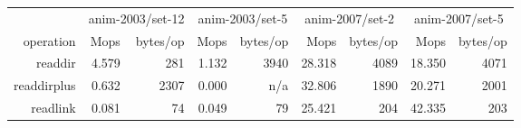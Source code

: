 \begin{table*}
\begin{tabular}{|r||r|r||r|r||r|r||r|r|}
\hline
  & \multicolumn{2}{c||}{anim-2003/set-12} & \multicolumn{2}{c||}{anim-2003/set-5} & \multicolumn{2}{c||}{anim-2007/set-2} & \multicolumn{2}{c|}{anim-2007/set-5} \\
   operation &   Mops & bytes/op &   Mops & bytes/op &   Mops & bytes/op &   Mops & bytes/op \\
\hline
     readdir &     4.579 &   281 &     1.132 &  3940 &    28.318 &  4089 &    18.350 &  4071 \\
 readdirplus &     0.632 &  2307 &     0.000 &  n/a  &    32.806 &  1890 &    20.271 &  2001 \\
    readlink &     0.081 &    74 &     0.049 &    79 &    25.421 &   204 &    42.335 &   203 \\

\end{tabular}
\end{table*}
